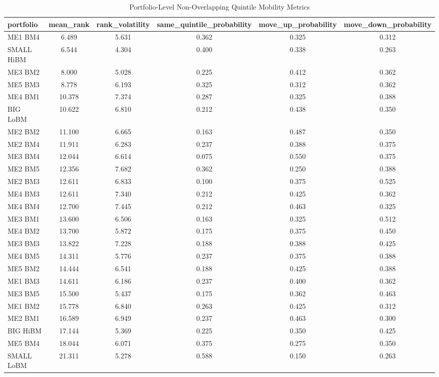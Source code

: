 \begin{table}
\caption{Portfolio-Level Non-Overlapping Quintile Mobility Metrics}
\label{tab:quintile_mobility}
\begin{tabular}{lccccc}
\toprule
portfolio & mean_rank & rank_volatility & same_quintile_probability & move_up_probability & move_down_probability \\
\midrule
ME1 BM4 & 6.489 & 5.631 & 0.362 & 0.325 & 0.312 \\
SMALL HiBM & 6.544 & 4.304 & 0.400 & 0.338 & 0.263 \\
ME3 BM2 & 8.000 & 5.028 & 0.225 & 0.412 & 0.362 \\
ME5 BM3 & 8.778 & 6.193 & 0.325 & 0.312 & 0.362 \\
ME4 BM1 & 10.378 & 7.374 & 0.287 & 0.325 & 0.388 \\
BIG LoBM & 10.622 & 6.810 & 0.212 & 0.438 & 0.350 \\
ME2 BM2 & 11.100 & 6.665 & 0.163 & 0.487 & 0.350 \\
ME2 BM4 & 11.911 & 6.283 & 0.237 & 0.388 & 0.375 \\
ME3 BM4 & 12.044 & 6.614 & 0.075 & 0.550 & 0.375 \\
ME2 BM5 & 12.356 & 7.682 & 0.362 & 0.250 & 0.388 \\
ME2 BM3 & 12.611 & 6.833 & 0.100 & 0.375 & 0.525 \\
ME4 BM3 & 12.611 & 7.340 & 0.212 & 0.425 & 0.362 \\
ME4 BM4 & 12.700 & 7.445 & 0.212 & 0.463 & 0.325 \\
ME3 BM1 & 13.600 & 6.506 & 0.163 & 0.325 & 0.512 \\
ME4 BM2 & 13.700 & 5.872 & 0.175 & 0.375 & 0.450 \\
ME3 BM3 & 13.822 & 7.228 & 0.188 & 0.388 & 0.425 \\
ME4 BM5 & 14.311 & 5.776 & 0.237 & 0.375 & 0.388 \\
ME5 BM2 & 14.444 & 6.541 & 0.188 & 0.425 & 0.388 \\
ME1 BM3 & 14.611 & 6.186 & 0.237 & 0.400 & 0.362 \\
ME3 BM5 & 15.500 & 5.437 & 0.175 & 0.362 & 0.463 \\
ME1 BM2 & 15.778 & 6.840 & 0.263 & 0.425 & 0.312 \\
ME2 BM1 & 16.589 & 6.949 & 0.237 & 0.463 & 0.300 \\
BIG HiBM & 17.144 & 5.369 & 0.225 & 0.350 & 0.425 \\
ME5 BM4 & 18.044 & 6.071 & 0.375 & 0.275 & 0.350 \\
SMALL LoBM & 21.311 & 5.278 & 0.588 & 0.150 & 0.263 \\
\bottomrule
\end{tabular}
\end{table}
